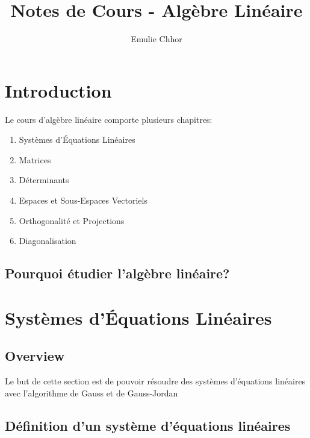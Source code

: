 \documentclass{article}
\begin{document}
\title{Notes de Cours - Algèbre Linéaire}
\author{Emulie Chhor}
\maketitle


\section*{Introduction}

Le cours d'algèbre linéaire comporte plusieurs chapitres:

    \begin{enumerate}
	\item Systèmes d'Équations Linéaires
	\item Matrices
	\item Déterminants
	\item Espaces et Sous-Espaces Vectoriels
	\item Orthogonalité et Projections
	\item Diagonalisation
    \end{enumerate}

\newtheorem{definition}{Definition}[subsection]
\newtheorem{theorem}{Theorem}[subsection]
\newtheorem{corollary}{Corollary}[subsection]
\newtheorem{lemma}[theorem]{Lemma}
\newtheorem{proposition}{Proposition}[section]
\newtheorem{axiom}{Axiome}
\newtheorem{property}{Propriété}[subsection]
\newtheorem*{remark}{Remarque}
\newtheorem*{problem}{Problème}
\newtheorem*{intuition}{Intuition}

\subsection{Pourquoi étudier l'algèbre linéaire?}

\pagebreak

\section{Systèmes d'Équations Linéaires}

\subsection{Overview}

Le but de cette section est de pouvoir résoudre des systèmes d'équations linéaires
avec l'algorithme de Gauss et de Gauss-Jordan

\subsection{Définition d'un système d'équations linéaires}
\end{document}
